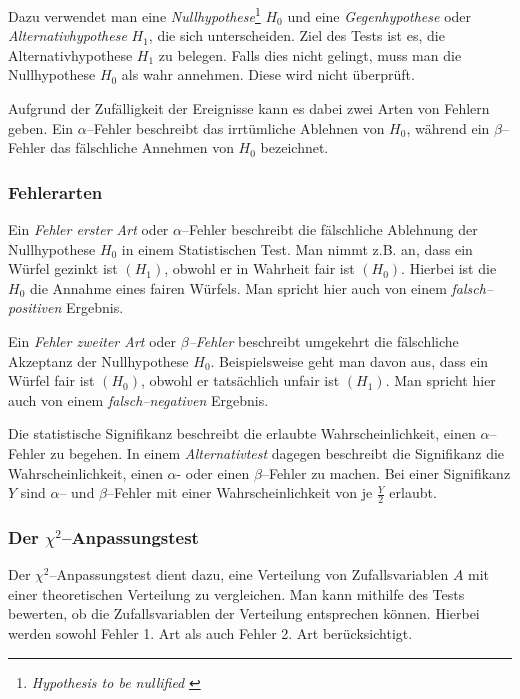 \documentclass[12pt,a4paper]{scrartcl}
\numberwithin{equation}{section} %
\begin{document}
Dazu verwendet man eine \emph{Nullhypothese}\footnote{\emph{Hypothesis  to be nullified} \cite{Gigerenzer}} $H_0$ und eine \emph{Gegenhypothese} oder \emph{Alternativhypothese} $H_1$, die sich unterscheiden. Ziel des Tests ist es, die Alternativhypothese $H_1$ zu belegen. Falls dies nicht gelingt, muss man die Nullhypothese $H_0$ als wahr annehmen. Diese wird nicht überprüft. \cite{Statistical Inference}

Aufgrund der Zufälligkeit der Ereignisse kann es dabei zwei Arten von Fehlern geben. Ein $\alpha$--Fehler beschreibt das irrtümliche Ablehnen von $H_0$, während ein $\beta$--Fehler das fälschliche Annehmen von $H_0$ bezeichnet.

\hypertarget{fehlerarten}{%
\subsubsection{Fehlerarten}\label{fehlerarten}}
Ein \emph{Fehler erster Art} oder $\alpha$--Fehler beschreibt die fälschliche Ablehnung der Nullhypothese $H_0$ in einem Statistischen Test. Man nimmt z.B. an, dass ein Würfel gezinkt ist $(H_1)$, obwohl er in Wahrheit fair ist $(H_0)$. Hierbei ist die $H_0$ die Annahme eines fairen Würfels. Man spricht hier auch von einem \emph{falsch--positiven} Ergebnis. \cite{Statistical Inference}

Ein \emph{Fehler zweiter Art} oder \emph{$\beta$--Fehler} beschreibt umgekehrt die fälschliche Akzeptanz der Nullhypothese $H_0$. Beispielsweise geht man davon aus, dass ein Würfel fair ist $(H_0)$, obwohl er tatsächlich unfair ist $(H_1)$. Man spricht hier auch von einem \emph{falsch--negativen} Ergebnis. \cite{Statistical Inference}

Die statistische Signifikanz beschreibt die erlaubte Wahrscheinlichkeit, einen $\alpha$--Fehler zu begehen. \cite{Statistical Inference} In einem \emph{Alternativtest} dagegen beschreibt die Signifikanz die Wahrscheinlichkeit, einen $\alpha$- oder einen $\beta$--Fehler zu machen. Bei einer Signifikanz $Y$ sind $\alpha$-- und $\beta$--Fehler mit einer Wahrscheinlichkeit von je $\frac{Y}{2}$ erlaubt.

\hypertarget{der-chi2anpassungstest}{%
\subsubsection{\texorpdfstring{Der
$\chi^2$--Anpassungstest}{Der \textbackslash chi\^{}2--Anpassungstest}}\label{der-chi2anpassungstest}}

Der $\chi^2$--Anpassungstest dient dazu, eine Verteilung von Zufallsvariablen $A$ mit einer theoretischen Verteilung zu vergleichen. Man kann mithilfe des Tests bewerten, ob die Zufallsvariablen der Verteilung entsprechen können. Hierbei werden sowohl Fehler 1. Art als auch Fehler 2. Art berücksichtigt.
\end{document}
